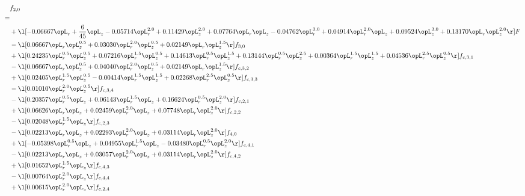\begin{alignat}{2} 
\label{eq:f_20_2} 
& f_{2,0} \nonumber \\ 
 = \\ 
& + \l[  -0.06667 \opL_r + \frac{6}{45} \opL_z   -0.05714 \opL_r^{2.0} +  0.11429 \opL_z^{2.0} +  0.07764 \opL_r \opL_z   -0.04762 \opL_r^{3.0} +  0.04914 \opL_r^{2.0} \opL_z +  0.09524 \opL_z^{3.0} +  0.13170 \opL_r \opL_z^{2.0}  \r] F \nonumber \\ 
& - \l[  0.06667 \opL_r \opL_z^{0.5} +  0.03030 \opL_r^{2.0} \opL_z^{0.5} +  0.02149 \opL_r \opL_z^{1.5}  \r] f_{3,0} \nonumber \\ 
& + \l[  0.24235 \opL_r^{0.5} \opL_z^{0.5} +  0.07216 \opL_r^{1.5} \opL_z^{0.5} +  0.14613 \opL_r^{0.5} \opL_z^{1.5} +  0.13144 \opL_r^{0.5} \opL_z^{2.5} +  0.00364 \opL_r^{1.5} \opL_z^{1.5} +  0.04536 \opL_r^{2.5} \opL_z^{0.5}  \r] f_{c,3,1} \nonumber \\ 
& - \l[  0.06667 \opL_r \opL_z^{0.5} +  0.04040 \opL_r^{2.0} \opL_z^{0.5} +  0.02149 \opL_r \opL_z^{1.5}  \r] f_{c,3,2} \nonumber \\ 
& + \l[  0.02405 \opL_r^{1.5} \opL_z^{0.5}   -0.00414 \opL_r^{1.5} \opL_z^{1.5} +  0.02268 \opL_r^{2.5} \opL_z^{0.5}  \r] f_{c,3,3} \nonumber \\ 
& - \l[  0.01010 \opL_r^{2.0} \opL_z^{0.5}  \r] f_{c,3,4} \nonumber \\ 
& - \l[  0.20357 \opL_r^{0.5} \opL_z +  0.06143 \opL_r^{1.5} \opL_z +  0.16624 \opL_r^{0.5} \opL_z^{2.0}  \r] f_{c,2,1} \nonumber \\ 
& + \l[  0.06626 \opL_r \opL_z +  0.02459 \opL_r^{2.0} \opL_z +  0.07748 \opL_r \opL_z^{2.0}  \r] f_{c,2,2} \nonumber \\ 
& - \l[  0.02048 \opL_r^{1.5} \opL_z  \r] f_{c,2,3} \nonumber \\ 
& - \l[  0.02213 \opL_r \opL_z +  0.02293 \opL_r^{2.0} \opL_z +  0.03114 \opL_r \opL_z^{2.0}  \r] f_{4,0} \nonumber \\ 
& + \l[  -0.05398 \opL_r^{0.5} \opL_z +  0.04955 \opL_r^{1.5} \opL_z   -0.03480 \opL_r^{0.5} \opL_z^{2.0}  \r] f_{c,4,1} \nonumber \\ 
& - \l[  0.02213 \opL_r \opL_z +  0.03057 \opL_r^{2.0} \opL_z +  0.03114 \opL_r \opL_z^{2.0}  \r] f_{c,4,2} \nonumber \\ 
& + \l[  0.01652 \opL_r^{1.5} \opL_z  \r] f_{c,4,3} \nonumber \\ 
& - \l[  0.00764 \opL_r^{2.0} \opL_z  \r] f_{c,4,4} \nonumber \\ 
& + \l[  0.00615 \opL_r^{2.0} \opL_z  \r] f_{c,2,4} \nonumber \\ 
\end{alignat} 


